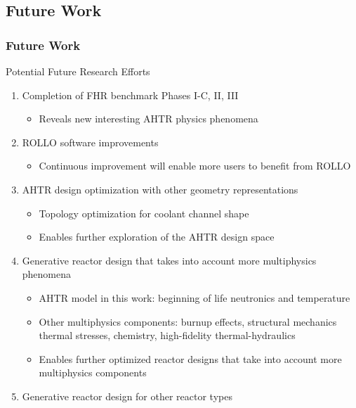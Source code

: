\subsection{Future Work}
\begin{frame}
    \frametitle{Future Work}
    \begin{block}{Potential Future Research Efforts}
    \begin{enumerate}
        \item Completion of FHR benchmark Phases I-C, II, III
        \begin{itemize}
            \item Reveals new interesting AHTR physics phenomena 
        \end{itemize}
        \item ROLLO software improvements 
            \begin{itemize}
                \item Continuous improvement will enable more users to benefit from ROLLO
            \end{itemize}
        \item AHTR design optimization with other geometry representations 
            \begin{itemize}
                \item Topology optimization for coolant channel shape 
                \item Enables further exploration of the AHTR design space 
            \end{itemize}
        \item Generative reactor design that takes into account more multiphysics phenomena 
            \begin{itemize}
                \item AHTR model in this work: beginning of life neutronics and temperature 
                \item Other multiphysics components: burnup effects, structural mechanics 
                thermal stresses, chemistry, high-fidelity thermal-hydraulics 
                \item Enables further optimized reactor designs that take into account more 
                multiphysics components 
            \end{itemize}
        \item Generative reactor design for other reactor types
    \end{enumerate}
    \end{block}
\end{frame}